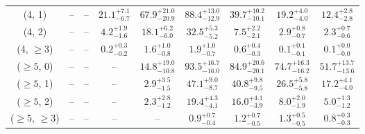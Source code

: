 \begin{table}[h!]
{\begin{tabular}{ccccccccc}
	(4, 1) & -- & -- & $21.1^{+ 7.1 }_{- 6.7 }$ & $67.9^{+ 21.0 }_{- 20.9 }$ & $88.4^{+ 13.0 }_{- 12.9 }$ & $39.7^{+ 10.2 }_{- 10.1 }$ & $19.2^{+ 4.0 }_{- 4.0 }$ & $12.4^{+ 2.8 }_{- 2.8 }$ \\[0.5ex] 
	(4, 2) & -- & -- & $4.2^{+ 1.9 }_{- 1.6 }$ & $18.1^{+ 6.2 }_{- 6.0 }$ & $32.5^{+ 5.3 }_{- 5.2 }$ & $7.5^{+ 2.2 }_{- 2.1 }$ & $2.9^{+ 0.8 }_{- 0.7 }$ & $2.3^{+ 0.7 }_{- 0.6 }$ \\[0.5ex] 
	(4, $\ge3$) & -- & -- & $0.2^{+ 0.3 }_{- 0.2 }$ & $1.6^{+ 1.0 }_{- 0.8 }$ & $1.9^{+ 1.0 }_{- 0.7 }$ & $0.6^{+ 0.4 }_{- 0.3 }$ & $0.1^{+ 0.1 }_{- 0.1 }$ & $0.1^{+ 0.0 }_{- 0.0 }$ \\[0.5ex] 
	($\ge5$, 0) & -- & -- & -- & $14.8^{+ 19.0 }_{- 10.8 }$ & $93.5^{+ 16.7 }_{- 16.0 }$ & $84.9^{+ 20.6 }_{- 20.1 }$ & $74.7^{+ 16.3 }_{- 16.2 }$ & $51.7^{+ 13.7 }_{- 13.6 }$ \\[0.5ex] 
	($\ge5$, 1) & -- & -- & -- & $2.9^{+ 3.5 }_{- 1.5 }$ & $47.1^{+ 9.0 }_{- 8.7 }$ & $40.8^{+ 9.8 }_{- 9.5 }$ & $26.5^{+ 5.8 }_{- 5.8 }$ & $17.2^{+ 4.1 }_{- 4.0 }$ \\[0.5ex] 
	($\ge5$, 2) & -- & -- & -- & $2.3^{+ 2.8 }_{- 1.2 }$ & $19.4^{+ 4.3 }_{- 4.1 }$ & $16.0^{+ 4.1 }_{- 3.9 }$ & $8.0^{+ 2.0 }_{- 1.9 }$ & $5.0^{+ 1.3 }_{- 1.2 }$ \\[0.5ex] 
	($\ge5$, $\ge3$) & -- & -- & -- & -- & $0.9^{+ 0.7 }_{- 0.4 }$ & $1.2^{+ 0.7 }_{- 0.5 }$ & $1.3^{+ 0.5 }_{- 0.5 }$ & $0.8^{+ 0.3 }_{- 0.3 }$ \\[0.5ex] 
	\hline
	\hline
\end{tabular}}
\end{table}
